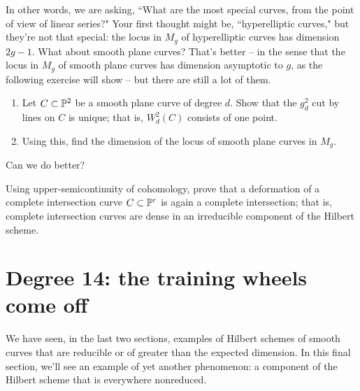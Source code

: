 In other words, we are asking, ``What are the most special curves, from the point of view of linear series?" Your first thought might be, ``hyperelliptic curves," but they're not that special: the locus in $M_g$ of hyperelliptic curves has dimension $2g-1$. What about smooth plane curves? That's better -- in the sense that the locus in $M_g$ of smooth plane curves has dimension asymptotic to $g$, as the following exercise will show -- but there are still a lot of them.

\begin{exercise}
\begin{enumerate}
\item Let $C \subset {\mathbb P}^2$ be a smooth plane curve of degree $d$. Show that the $g^2_d$ cut by lines on $C$ is unique; that is, $W^2_d(C)$ consists of one point.
\item Using this, find the dimension of the locus of smooth plane curves in $M_g$.
\end{enumerate}
\end{exercise}

Can we do better?  

\begin{exercise}
Using upper-semicontinuity of cohomology, prove that a deformation of a complete intersection curve $C \subset {\mathbb P}^r$ is again a complete intersection; that is, complete intersection curves are dense in an irreducible component of the Hilbert scheme.
\end{exercise}                                                                                                                                                                                                                                                                                                                                                                                                                                                                                                                                                                                                                                                         

 

\section{Degree 14: the training wheels come off}

We have seen, in the last two sections, examples of Hilbert schemes of smooth curves that are reducible or of greater than the expected dimension. In this final section, we'll see an example of yet another phenomenon: a component of the Hilbert scheme that is everywhere nonreduced. 

